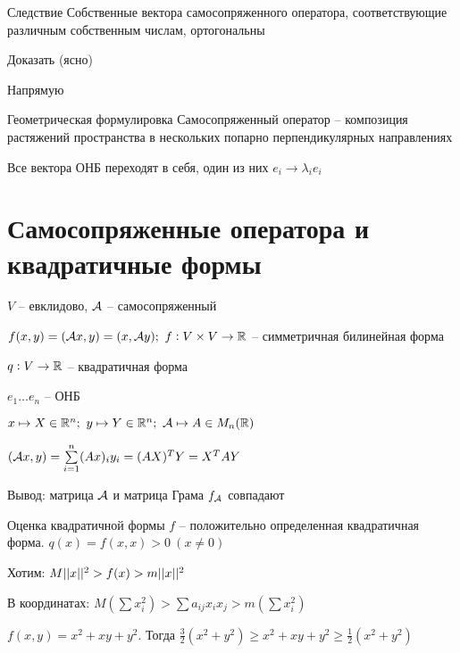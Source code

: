 \documentclass[12pt]{article}
\begin{document}
\begin{theo}{Следствие}
    Собственные вектора самосопряженного оператора, соответствующие различным собственным числам, ортогональны 
\end{theo}

\begin{Exercise}{}
    Доказать (ясно)

    Напрямую
\end{Exercise}

\begin{nota}{Геометрическая формулировка}
    Самосопряженный оператор -- композиция растяжений пространства в нескольких попарно перпендикулярных направлениях

    Все вектора ОНБ переходят в себя, один из них $e_i \to \lambda_i e_i$
\end{nota}

\newpage

\section{Самосопряженные оператора и квадратичные формы}

\begin{defin}{}
    $V$ -- евклидово, $\mathcal{A}$ -- самосопряженный 

    $f(x, y) = (\mathcal{A} x, y) = (x, \mathcal{A} y);\ f : V \times V \to \mathbb R$ -- симметричная билинейная форма

    $q : V \to \mathbb R$ -- квадратичная форма

    $e_1 \ldots e_n$ -- ОНБ 

    $x \mapsto X \in \mathbb R^n;\ y \mapsto Y \in \mathbb R^n;\ \mathcal{A} \mapsto A \in M_n(\mathbb R)$

    $(\mathcal{A} x, y) = \sum\limits_{i = 1}^n (A x)_i y_i = (AX)^T Y = X^TAY$

    Вывод: матрица $\mathcal{A}$ и матрица Грама $f_{\mathcal{A}}$ совпадают
\end{defin}

\begin{nota}{Оценка квадратичной формы}
    $f$ -- положительно определенная квадратичная форма. $q(x) = f(x, x) > 0\ (x \neq 0)$

    Хотим: $M || x ||^2 > f(x) > m || x ||^2$

    В координатах: $M(\sum x_i^2) > \sum a_{ij}x_ix_j > m(\sum x_i^2)$

    $f(x, y) = x^2 + xy + y^2$. Тогда $\frac{3}{2}(x^2 + y^2) \geq x^2 + xy + y^2 \geq \frac{1}{2}(x^2 + y^2)$
\end{nota}
\end{document}
